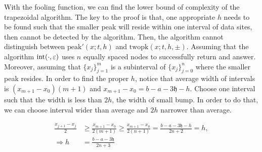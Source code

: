 \documentclass{iitthesis}
\theoremstyle{definition}
\theoremstyle{remark}
\begin{document}
With the fooling function, we can find the lower bound of complexity of the trapezoidal algorithm. The key to the proof is that, one appropriate $h$ needs to be found such that the smaller peak will reside within one interval of data sites, then cannot be detected by the algorithm. Then, the algorithm cannot distinguish between $\text{peak}'(x;t,h)$ and $\text{twopk}(x;t,h,\pm)$. Assuming that the algorithm $\textup{int}(\cdot,\varepsilon)$ uses $n$ equally spaced nodes to successfully return and answer. Moreover, assuming that $\{x_{j}\}_{j=1}^{m}$ is a subinterval of $\{x_{j}\}_{j=0}^{n}$ where the smaller peak resides. In order to find the proper $h$, notice that average width of intervals is $(x_{m+1}-x_{0})(m+1)$ and $x_{m+1}-x_{0}=b-a-3\mathfrak{h}-h$. Choose one interval such that the width is less than $2h$, the width of small bump. In order to do that, we can choose interval wider than average and $2h$ narrower than average.

  \begin{align*}
    \frac{x_{j+1}-x_{j}}{2}&\ge\frac{x_{m+1}-x_{0}}{2(m+1)}\ge\frac{x_{m+1}-x_{0}}{2(n+1)}=\frac{b-a-3\mathfrak{h}-h}{2n+2}=h,\\
    \Rightarrow h&=\frac{b-a-3\mathfrak{h}}{2n+3}
  \end{align*}
\end{document}
